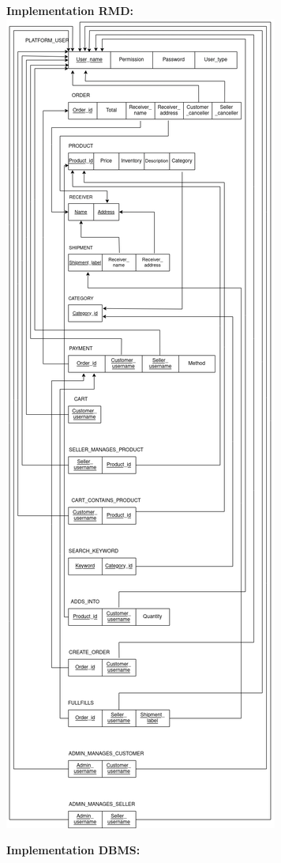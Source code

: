\documentclass[12pt]{article}
\begin{document}
\newpage
\textbf{Implementation RMD:}
\includegraphics[height=.98\textheight]{Diagrams/relation.png}

\newpage 
\textbf{Implementation DBMS:}
\end{document}
